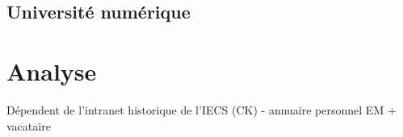 \documentclass{book}
\begin{document}
\section{Université numérique}



\chapter{Analyse}


Dépendent de l'intranet historique de l'IECS (CK)
- annuaire personnel EM + vacataire




\appendix
%
\printindex
\end{document}

